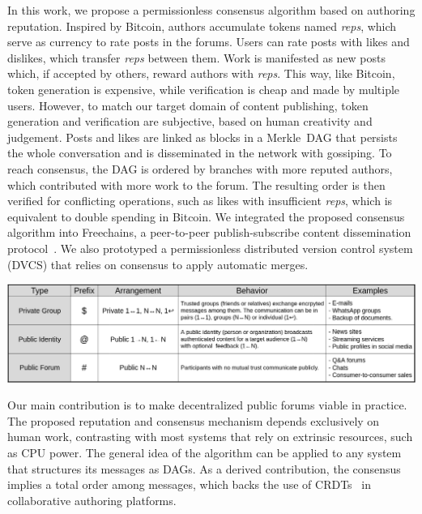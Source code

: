 \documentclass[10pt,journal,compsoc]{IEEEtran}
\newcommand{\FC}       {Freechains\xspace}
\newcommand{\reps}     {\emph{reps}\xspace}
\begin{document}
In this work, we propose a permissionless consensus algorithm based on
authoring reputation.
Inspired by Bitcoin, authors accumulate tokens named \reps, which serve as
currency to rate posts in the forums.
Users can rate posts with likes and dislikes, which transfer \reps between
them.
Work is manifested as new posts which, if accepted by others, reward authors
with \reps.
This way, like Bitcoin, token generation is expensive, while verification is
cheap and made by multiple users.
However, to match our target domain of content publishing, token generation and
verification are subjective, based on human creativity and judgement.
Posts and likes are linked as blocks in a Merkle~DAG that persists the whole
conversation and is disseminated in the network with gossiping.
To reach consensus, the DAG is ordered by branches with more reputed authors,
which contributed with more work to the forum.
The resulting order is then verified for conflicting operations, such as likes
with insufficient \reps, which is equivalent to double spending in Bitcoin.
%
We integrated the proposed consensus algorithm into \FC, a peer-to-peer
publish-subscribe content dissemination protocol~\cite{fcs.sbseg20}.
We also prototyped a permissionless distributed version control system (DVCS)
that relies on consensus to apply automatic merges.

\begin{table}
\centering
\includegraphics[width=\textwidth]{arrangements.png}
\caption{The three types of chains and arrangements in \FC.}
\label{fig.table}
\end{table}

Our main contribution is to make decentralized public forums viable in
practice.
The proposed reputation and consensus mechanism depends exclusively on human
work, contrasting with most systems that rely on extrinsic resources, such as
CPU power.
The general idea of the algorithm can be applied to any system that structures
its messages as DAGs.
As a derived contribution, the consensus implies a total order among messages,
which backs the use of CRDTs~\cite{p2p.merkle-crdts} in collaborative authoring
platforms.
\end{document}

